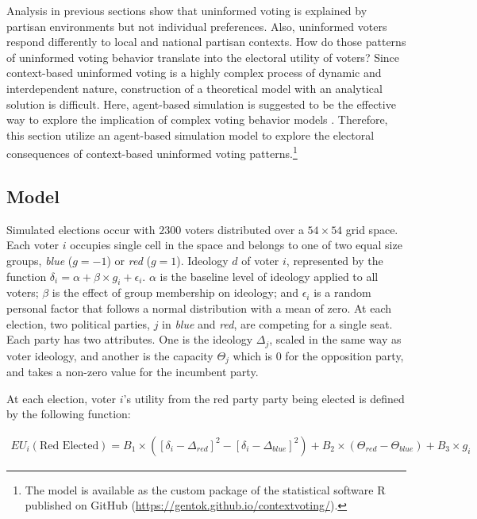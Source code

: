 \documentclass[letterpaper, 12pt]{article}
\begin{document}
    \par Analysis in previous sections show that uninformed voting is explained by partisan environments but not individual preferences. Also, uninformed voters respond differently to local and national partisan contexts. How do those patterns of uninformed voting behavior translate into the electoral utility of voters? Since context-based uninformed voting is a highly complex process of dynamic and interdependent nature, construction of a theoretical model with an analytical solution is difficult. Here, agent-based simulation is suggested to be the effective way to explore the implication of complex voting behavior models \citep{Bendor2011beth}. Therefore, this section utilize an agent-based simulation model to explore the electoral consequences of context-based uninformed voting patterns.\footnote{The model is available as the custom package of the statistical software R published on GitHub (\url{https://gentok.github.io/contextvoting/}).}
    
    \subsection*{Model}

    \par Simulated elections occur with $2300$ voters distributed over a $54\times54$ grid space. Each voter $i$ occupies single cell in the space and belongs to one of two equal size groups, \textit{blue} ($g=-1$) or \textit{red} ($g=1$). Ideology $d$ of voter $i$, represented by the function $\delta_i = \alpha + \beta \times g_i + \epsilon_i$. $\alpha$ is the baseline level of ideology applied to all voters; $\beta$ is the effect of group membership on ideology; and $\epsilon_i$ is a random personal factor that follows a normal distribution with a mean of zero. At each election, two political parties, $j$ in \textit{blue} and \textit{red}, are competing for a single seat. Each party has two attributes. One is the ideology $\Delta_j$, scaled in the same way as voter ideology, and another is the capacity $\Theta_j$ which is $0$ for the opposition party, and takes a non-zero value for the incumbent party.

    \par At each election, voter $i$'s utility from the red party party being elected is defined by the following function:  

    \begin{align*}
        EU_i(\mbox{Red Elected}) =  B_1 \times ([\delta_i-\Delta_{red}]^2 - [\delta_i-\Delta_{blue}]^2) + B_2 \times (\Theta_{red} - \Theta_{blue}) +  B_3 \times g_i
    \end{align*}
\end{document}
